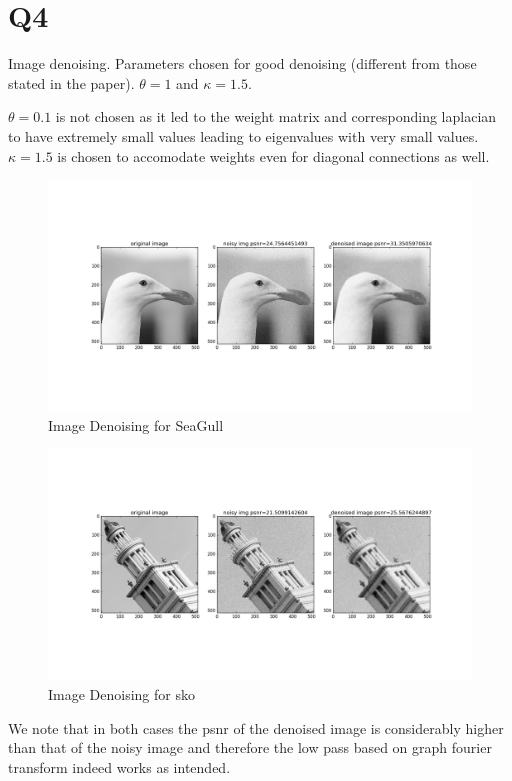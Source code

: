 \documentclass{article}
\begin{document}
\section*{Q4}
Image denoising. Parameters chosen for good denoising (different from those stated in the paper). $\theta = 1$ and $\kappa = 1.5$.

$\theta = 0.1$ is not chosen as it led to the weight matrix and corresponding laplacian to have extremely small values leading to eigenvalues with very small values. $\kappa = 1.5$ is chosen to accomodate weights even for diagonal connections as well.

\begin{figure}[H]
  \centering
  \includegraphics[scale=0.4]{images/q4_1_denoise}
  \caption{Image Denoising for SeaGull}
  \label{fig:q4_1}
\end{figure}

\begin{figure}[H]
  \centering
  \includegraphics[scale=0.4]{images/q4_2_denoise}
  \caption{Image Denoising for sko}
  \label{fig:q4_2}
\end{figure}

We note that in both cases the psnr of the denoised image is considerably higher than that of the noisy image and therefore the low pass based on graph fourier transform indeed works as intended.
\end{document}

